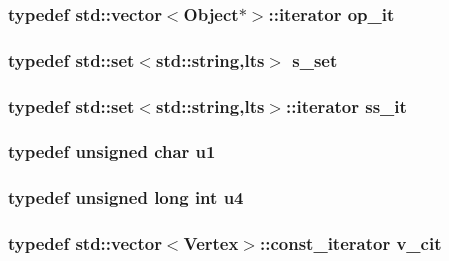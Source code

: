 \subsubsection{\setlength{\rightskip}{0pt plus 5cm}typedef std::vector$<${\bf Object}$\ast$$>$::iterator {\bf op\_\-it}}\label{meshmorph_8h_0f1596befebd38f6b2fe4e7fa62849b9}


\subsubsection{\setlength{\rightskip}{0pt plus 5cm}typedef std::set$<$std::string,{\bf lts}$>$ {\bf s\_\-set}}\label{meshmorph_8h_b394658db9d9ed70f0e9787f901f9428}


\subsubsection{\setlength{\rightskip}{0pt plus 5cm}typedef std::set$<$std::string,{\bf lts}$>$::iterator {\bf ss\_\-it}}\label{meshmorph_8h_e330971fee652d58e1a7fb9154dfbcff}


\subsubsection{\setlength{\rightskip}{0pt plus 5cm}typedef unsigned char {\bf u1}}\label{meshmorph_8h_216a9f8b04b4f0af84a4ca9d1d85a6ca}


\subsubsection{\setlength{\rightskip}{0pt plus 5cm}typedef unsigned long int {\bf u4}}\label{meshmorph_8h_9bcb189c00c284557b4f61c53de32d16}


\subsubsection{\setlength{\rightskip}{0pt plus 5cm}typedef std::vector$<${\bf Vertex}$>$::const\_\-iterator {\bf v\_\-cit}}\label{meshmorph_8h_dfa48b42fdac70f72a266296787d27e6}



